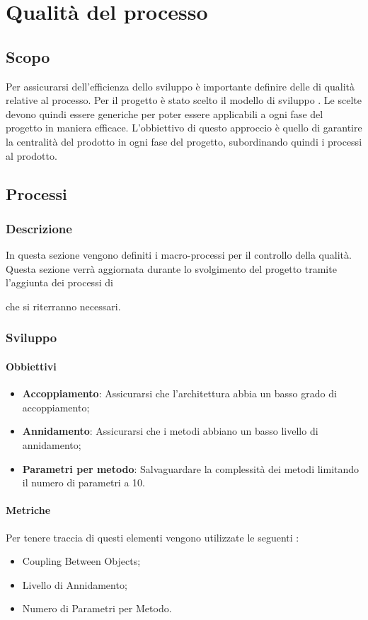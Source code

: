 \section{Qualità del processo}

\subsection{Scopo}
Per assicurarsi dell'efficienza dello sviluppo è importante definire delle  di qualità relative al processo.
Per il progetto è stato scelto il modello di sviluppo .
Le  scelte devono quindi essere generiche per poter essere applicabili a ogni fase del progetto in maniera efficace.
L'obbiettivo di questo approccio è quello di garantire la centralità del prodotto in ogni fase del progetto, subordinando quindi i processi al prodotto.

\subsection{Processi}
\subsubsection{Descrizione}
In questa sezione vengono definiti i macro-processi per il controllo della qualità.
Questa sezione verrà aggiornata durante lo svolgimento del progetto tramite l'aggiunta dei processi di  che si riterranno necessari.

\subsubsection{Sviluppo}
\paragraph{Obbiettivi}
\begin{itemize}
\item \textbf{Accoppiamento}: Assicurarsi che l'architettura abbia un basso grado di accoppiamento;
\item \textbf{Annidamento}: Assicurarsi che i metodi abbiano un basso livello di annidamento;
\item \textbf{Parametri per metodo}: Salvaguardare la complessità dei metodi limitando il numero di parametri a 10.
\end{itemize}

\paragraph{Metriche}
Per tenere traccia di questi elementi vengono utilizzate le seguenti :
\begin{itemize}
\item Coupling Between Objects;
\item Livello di Annidamento;
\item Numero di Parametri per Metodo.
\end{itemize}

